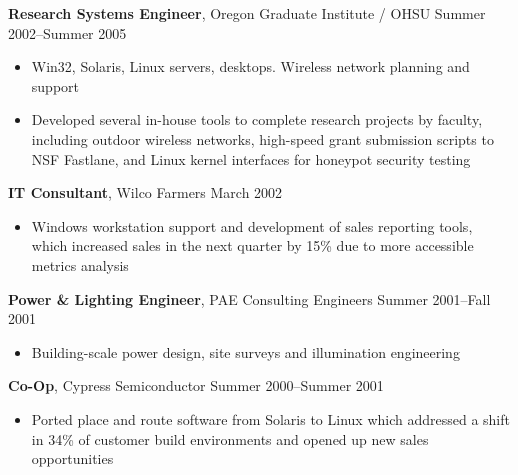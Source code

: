 {\bf Research Systems Engineer}, Oregon Graduate Institute / OHSU \hfill Summer 2002--Summer 2005
\begin{itemize}
	\item{Win32, Solaris, Linux servers, desktops.  Wireless network planning and support}
    \item{Developed several in-house tools to complete research projects by faculty, including outdoor wireless networks, high-speed grant submission scripts to NSF Fastlane, and Linux kernel interfaces for honeypot security testing}
\end{itemize}

{\bf IT Consultant}, Wilco Farmers \hfill March 2002
\begin{itemize}
	\item{Windows workstation support and development of sales reporting tools, which increased sales in the next quarter by 15\% due to more accessible metrics analysis}
\end{itemize}

{\bf Power \& Lighting Engineer}, PAE Consulting Engineers \hfill Summer 2001--Fall 2001
\begin{itemize}
	\item Building-scale power design, site surveys and illumination engineering
\end{itemize}

{\bf Co-Op}, Cypress Semiconductor \hfill Summer 2000--Summer 2001
\begin{itemize}
	\item Ported place and route software from Solaris to Linux which addressed a shift in 34\% of customer build environments and opened up new sales opportunities
\end{itemize}

